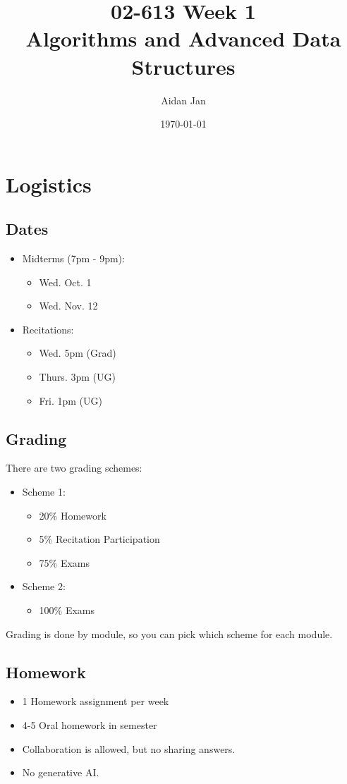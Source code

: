 \documentclass[10pt]{article}
\title{02-613 Week 1 \\ \large{Algorithms and Advanced Data Structures}}
\author{Aidan Jan}
\date{\today}
\begin{document}
\maketitle

\section*{Logistics}
\subsection*{Dates}
\begin{itemize}
    \item Midterms (7pm - 9pm):
    \begin{itemize}
	    \item Wed. Oct. 1
	    \item Wed. Nov. 12
    \end{itemize}
    \item Recitations:
    \begin{itemize}
	    \item Wed. 5pm (Grad)
	    \item Thurs. 3pm (UG)
	    \item Fri. 1pm (UG)
    \end{itemize}
\end{itemize}
\subsection*{Grading}
There are two grading schemes:
\begin{itemize}
	\item Scheme 1:
	\begin{itemize}
	    \item 20\% Homework
	    \item 5\% Recitation Participation
	    \item 75\% Exams
    \end{itemize}
    \item Scheme 2:
    \begin{itemize}
        \item 100\% Exams
    \end{itemize}
\end{itemize}
Grading is done by module, so you can pick which scheme for each module.
\subsection*{Homework}
\begin{itemize}
	\item 1 Homework assignment per week
	\item 4-5 Oral homework in semester
	\item Collaboration is allowed, but no sharing answers.
	\item No generative AI.
\end{itemize}
\end{document}
